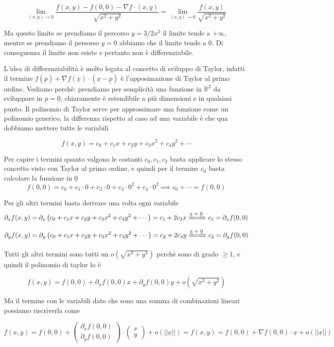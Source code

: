 \documentclass{rapport}
\begin{document}
\[
\lim_{(x,y) \to \underline{0}} \dfrac{f(x,y) - f(0,0) - \nabla f \cdot (x,y)}{\sqrt{x^2+y^2}} = \lim_{(x,y) \to \underline{0}} \dfrac{f(x,y)}{\sqrt{x^2+y^2}} 
\]

Ma questo limite se prendiamo il percorso $y=3/2x^2$ il limite tende a $+\infty$, mentre se prendiamo il persorso $y=0$ abbiamo che il limite tende a $0$. Di conseguenza il limite non esiste e pertanto non è differenziabile.

\newpage
L'idea di differenziabilità è molto legata al concetto di sviluppo di Taylor, infatti il termine $f(\underline{p}) + \nabla f(\underline{x}) \cdot (\underline{x} - \underline{p})$ è l'apposimazione di Taylor al primo ordine. Vediamo perchè: prendiamo per semplicità una funzione in $\mathbb{R}^2$ da sviluppare in $\underline{p} = \underline{0}$, chiaramente è estendibile a più dimensioni e in qualsiasi punto. Il polinomio di Taylor serve per approssimare una funzione come un polinomio generico, la differenza rispetto al caso ad una variabile è che qua dobbiamo mettere tutte le variabili

\[
f(x,y) = c_0 + c_1x + c_2y + c_3x^2 + c_4y^2+ \cdots
\]

Per capire i termini quanto valgono le costanti $c_0, c_1, c_2$ basta applicare lo stesso concetto visto con Taylor al primo ordine, e quindi per il termine $c_0$ basta calcolare la funzione in $\underline{0}$
\[
f(0,0) = c_0 + c_1 \cdot 0+ c_2 \cdot 0+ c_3 \cdot 0^2+ c_4 \cdot 0^2 \implies c_0 + \cdots = f(0,0)
\]

Per gli altri termini basta derivare una volta ogni variabile 
\[
\partial_x f(x,y) = \partial_x \left( c_0 + c_1x + c_2y + c_3x^2 + c_4y^2+ \cdots\right) = c_1 + 2c_3x \xRightarrow{\text{\underline{x} = \underline{0}}} c_1 = \partial_x f(0,0) 
\]
\[
\partial_y f(x,y) = \partial_y \left( c_0 + c_1x + c_2y + c_3x^2 + c_4y^2+ \cdots\right) = c_2 + 2c_4 y \xRightarrow{\text{\underline{x} = \underline{0}}}c_2 = \partial_y f(0,0) 
\]

Tutti gli altri termini sono tutti un $o(\sqrt{x^2+y^2})$ perchè sono di grado $\geq 1$, e quindi il polinomio di taylor lo è 

\[
f(x,y)  = f(0,0) + \partial_x f(0,0)x + \partial_y f(0,0) y + o(\sqrt{x^2+y^2})
\]

Ma il termine con le variabili dato che sono una somma di combinazioni lineari possiamo riscriverla come

\[
f(x,y)  = f(0,0) + \begin{pmatrix}
  \partial_x f(0,0) \\
  \partial_y f(0,0)
\end{pmatrix} \cdot \begin{pmatrix}
  x \\
  y
 \end{pmatrix} +o(||\underline{x}||)= f(x,y)  = f(0,0) +\nabla f(0,0) \cdot \underline{x}+o(||\underline{x}||)
\]
\end{document}
